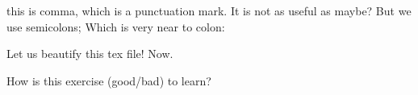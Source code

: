 \documentclass{article}
\begin{document}
this is comma, which is a punctuation mark. It is not as useful as maybe? But we use semicolons; Which is very near to colon: 

Let us beautify this tex file! Now. 

How is this exercise (good/bad) to learn? 
\end{document}
